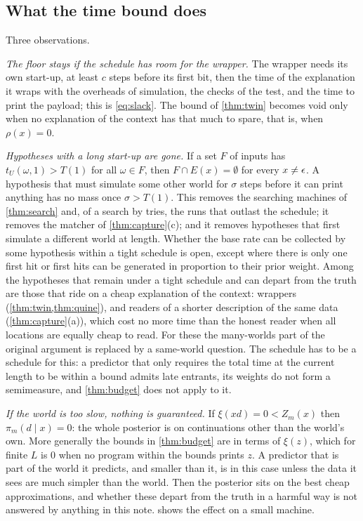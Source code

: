 \subsection{What the time bound does}\label{sec:time}

Three observations.

\emph{The floor stays if the schedule has room for the wrapper.} The wrapper needs its own start-up, at least
$c$ steps before its first bit, then the time of the explanation it wraps with the overheads of simulation,
the checks of the test, and the time to print the payload; this is \eqref{eq:slack}. The bound of
\cref{thm:twin} becomes void only when no explanation of the context has that much to spare, that is, when
$\rho(x)=0$.

\emph{Hypotheses with a long start-up are gone.} If a set $F$ of inputs has $t_U(\omega,1)>T(1)$ for all
$\omega\in F$, then $F\cap E(x)=\emptyset$ for every $x\ne\epsilon$. A hypothesis that must simulate some other
world for $\sigma$ steps before it can print anything has no mass once $\sigma>T(1)$. This removes the
searching machines of \cref{thm:search} and, of a search by tries, the runs that outlast the schedule; it
removes the matcher of \cref{thm:capture}(c); and it removes hypotheses that first simulate a different world
at length. Whether the base rate can be collected by some hypothesis within a tight schedule is open, except
where there is only one first hit or first hits can be generated in proportion to their prior weight. Among the hypotheses that remain under a tight schedule and can
depart from the truth are those that ride on a cheap explanation of the context: wrappers
(\cref{thm:twin,thm:quine}), and readers of a shorter description of the same data (\cref{thm:capture}(a)),
which cost no more time than the honest reader when all locations are equally cheap to read.
For these the many-worlds part of the original argument is replaced by a same-world question. The schedule has
to be a schedule for this: a predictor that only requires the total time at the current length to be within a
bound admits late entrants, its weights do not form a semimeasure, and \cref{thm:budget} does not apply to it.

\emph{If the world is too slow, nothing is guaranteed.} If $\xi(xd)=0<Z_m(x)$ then $\pi_m(d\mid x)=0$: the
whole posterior is on continuations other than the world's own. More generally the bounds in \cref{thm:budget}
are in terms of $\xi(z)$, which for finite $L$ is $0$ when no program within the bounds prints $z$. A predictor
that is part of the world it predicts, and smaller than it, is in this case unless the data it sees are much
simpler than the world. Then the posterior sits on the best cheap approximations, and whether these depart
from the truth in a harmful way is not answered by anything in this note.  shows the
effect on a small machine.
